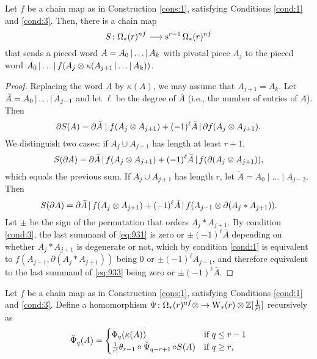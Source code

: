 \begin{proposition} Let $f$ be a chain map as in Construction \ref{cons:1}, satisfying Conditions \eqref{cond:1} and \eqref{cond:3}. Then, there is a chain map
	\[
	S\colon \Omega_*(r)^{nf}\longrightarrow \operatorname{s}^{r-1}\Omega_*(r)^{nf}
	\]
	that sends a pieced word $A = A_0\operatorname{|} \ldots\operatorname{|} A_k$ with pivotal piece $A_j$ to the pieced word $ A_0\operatorname{|} \ldots\operatorname{|} f(A_j\otimes \kappa(A_{j+1}\operatorname{|} \ldots\operatorname{|} A_k))$.
\end{proposition}
\begin{proof}
	Replacing the word $A$ by $\kappa(A)$, we may assume that $A_{j+1} = A_k$. Let $\bar{A} = A_0\operatorname{|} \ldots\operatorname{|} A_{j-1}$ and let $\ell$ be the degree of $\bar{A}$ (i.e., the number of entries of $A$). Then %
	\begin{equation}\label{eq:931}
		\partial S(A) = \partial \bar{A}\mid f(A_{j}\otimes A_{j+1}) + (-1)^{\ell}\bar{A}\operatorname{|} \partial f(A_{j}\otimes A_{j+1}).
	\end{equation}
	We distinguish two cases: if $A_j\cup A_{j+1}$ has length at least $r+1$,
	\[S(\partial A) = \partial \bar{A}\operatorname{|} f(A_j\otimes A_{j+1}) + (-1)^{\ell}\bar{A}\operatorname{|} f(\partial (A_j\otimes A_{j+1})),\]
	which equals the previous sum. If $A_j\cup A_{j+1}$ has length $r$, let $\check{A} = A_0\mid \ldots\mid A_{j-2}$. Then
	\begin{equation}\label{eq:933}
		S(\partial A) = \partial \bar{A}\operatorname{|} f(A_j\otimes A_{j+1}) + (-1)^\ell \check{A}\operatorname{|} f(A_{j-1}\otimes \partial(A_j*A_{j+1})).
	\end{equation}
	Let $\pm$ be the sign of the permutation that orders $A_j*A_{j+1}$. By condition \eqref{cond:3}, the last summand of \eqref{eq:931} is zero or $\pm(-1)^\ell\bar{A}$ depending on whether $A_j*A_{j+1}$ is degenerate or not, which by condition \eqref{cond:1} is equivalent to $f(A_{j-1},\partial(A_j*A_{j+1}))$ being $0$ or $\pm(-1)^{\ell}A_{j-1}$, and therefore equivalent to the last summand of \eqref{eq:933} being zero or $\pm(-1)^{\ell}\bar{A}$.
\end{proof}


\begin{definition}\label{def:psiom}
	Let $f$ be a chain map as in Construction \ref{cons:1}, satisfying Conditions \eqref{cond:1} and \eqref{cond:3}. Define a homomorphism $\Psi\colon \Omega_*(r)^{nf}\otimes \to \operatorname{W}_{*}(r)\otimes \mathbb{Z}[\frac{1}{\tilde{r}!}]$ recursively as
	\[\operatorname{\check{\Psi}}_q(A) = \begin{cases} \Phi_q(\kappa(A)) & \text{if $q\leq r-1$} \\
		\frac{1}{\tilde{r}!}\theta_{r-1}\circ \operatorname{\check{\Psi}}_{q-r+1}\circ S(A) & \text{if $q\geq r$,}\end{cases}\]
\end{definition}

